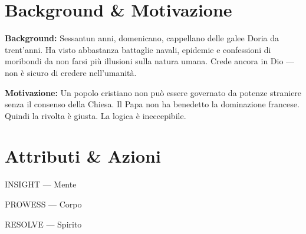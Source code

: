\clearpage



\section*{Background \& Motivazione}
\begin{rulebox}{}
  \textbf{Background:} Sessantun anni, domenicano, cappellano delle galee Doria da
  trent'anni. Ha visto abbastanza battaglie navali, epidemie e confessioni di moribondi
  da non farsi più illusioni sulla natura umana. Crede ancora in Dio — non è sicuro
  di credere nell'umanità.

  \medskip\noindent\textcolor{DoriaBlue}{\textbf{Motivazione:}} Un popolo cristiano
  non può essere governato da potenze straniere senza il consenso della Chiesa. Il Papa
  non ha benedetto la dominazione francese. Quindi la rivolta è giusta. La logica è
  ineccepibile.
\end{rulebox}

\section*{Attributi \& Azioni}
\begin{attributoblock}[DoriaBlue]{INSIGHT — Mente}
\end{attributoblock}
\begin{attributoblock}[DoriaBlue]{PROWESS — Corpo}
\end{attributoblock}
\begin{attributoblock}[DoriaBlue]{RESOLVE — Spirito}
  \end{attributoblock}

